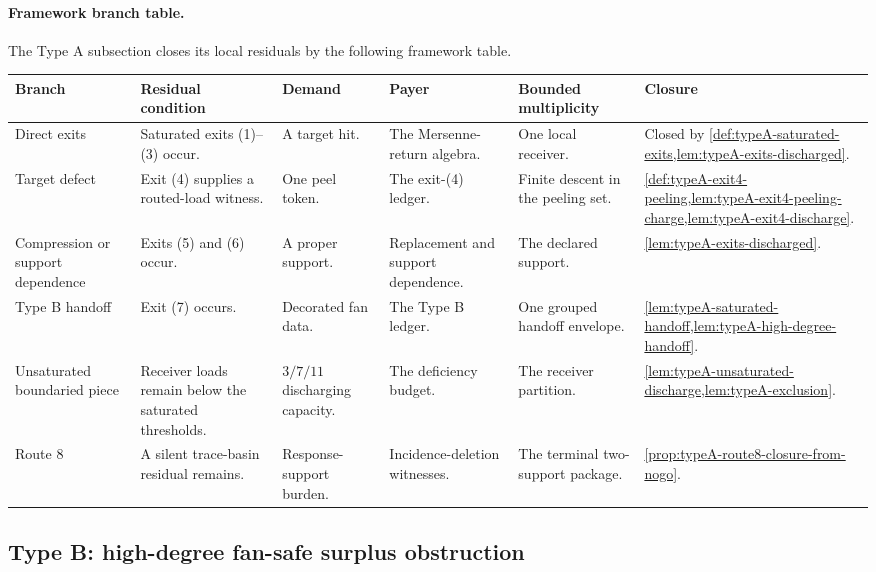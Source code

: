 \documentclass[11pt]{article}
\newcommand{\FrameworkBranchTableHeader}{%
\toprule
\textbf{Branch} & \textbf{Residual condition} & \textbf{Demand} & \textbf{Payer} & \textbf{Bounded multiplicity} & \textbf{Closure}\\
\midrule
}
\begin{document}
\paragraph{Framework branch table.}
The Type A subsection closes its local residuals by the following framework
table.
\begin{longtable}{L{0.13\textwidth} L{0.19\textwidth} L{0.14\textwidth} L{0.14\textwidth} L{0.17\textwidth} L{0.17\textwidth}}
\FrameworkBranchTableHeader
Direct exits
&
Saturated exits \textup{(1)}--\textup{(3)} occur.
&
A target hit.
&
The Mersenne-return algebra.
&
One local receiver.
&
Closed by \cref{def:typeA-saturated-exits,lem:typeA-exits-discharged}.
\\
\addlinespace
Target defect
&
Exit \textup{(4)} supplies a routed-load witness.
&
One peel token.
&
The exit-\textup{(4)} ledger.
&
Finite descent in the peeling set.
&
\cref{def:typeA-exit4-peeling,lem:typeA-exit4-peeling-charge,lem:typeA-exit4-discharge}.
\\
\addlinespace
Compression or support dependence
&
Exits \textup{(5)} and \textup{(6)} occur.
&
A proper support.
&
Replacement and support dependence.
&
The declared support.
&
\cref{lem:typeA-exits-discharged}.
\\
\addlinespace
Type B handoff
&
Exit \textup{(7)} occurs.
&
Decorated fan data.
&
The Type B ledger.
&
One grouped handoff envelope.
&
\cref{lem:typeA-saturated-handoff,lem:typeA-high-degree-handoff}.
\\
\addlinespace
Unsaturated boundaried piece
&
Receiver loads remain below the saturated thresholds.
&
\(3/7/11\) discharging capacity.
&
The deficiency budget.
&
The receiver partition.
&
\cref{lem:typeA-unsaturated-discharge,lem:typeA-exclusion}.
\\
\addlinespace
Route 8
&
A silent trace-basin residual remains.
&
Response-support burden.
&
Incidence-deletion witnesses.
&
The terminal two-support package.
&
\cref{prop:typeA-route8-closure-from-nogo}.
\\
\bottomrule
\end{longtable}

\subsection{Type B: high-degree fan-safe surplus obstruction}
\end{document}
